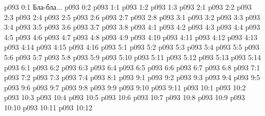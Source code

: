 \author{Мелхиседек}
\vs p093 0:1  Бла-бла...
\vs p093 0:2 \pc 
{}
\vs p093 1:1 
\vs p093 1:2 
\vs p093 1:3 
\vs p093 2:1 
\vs p093 2:2 
\vs p093 2:3 
\vs p093 2:4 \pc 
\vs p093 2:5 \pc 
\vs p093 2:6 
\vs p093 2:7 \pc 
\vs p093 2:8 
\vs p093 3:1 
\vs p093 3:2 
\vs p093 3:3 
\vs p093 3:4 
\vs p093 3:5 
\vs p093 3:6 
\vs p093 3:7 
\vs p093 3:8 
\vs p093 4:1 
\vs p093 4:2 
\vs p093 4:3 
\vs p093 4:4 
\vs p093 4:5 \pc 
\vs p093 4:6 \pc 
\vs p093 4:7 
\vs p093 4:8 
\vs p093 4:9 
\vs p093 4:10 
\vs p093 4:11 
\vs p093 4:12 
\vs p093 4:13 
\vs p093 4:14 \pc 
\vs p093 4:15 
\vs p093 4:16 \pc 
{}
\vs p093 5:1 
\vs p093 5:2 
\vs p093 5:3 
\vs p093 5:4 
\vs p093 5:5 
\vs p093 5:6 
\vs p093 5:7 \pc 
\vs p093 5:8 
\vs p093 5:9 \pc 
\vs p093 5:10 
\vs p093 5:11 
\vs p093 5:12 
\vs p093 5:13 
\vs p093 5:14 
\vs p093 6:1 
\vs p093 6:2 
\vs p093 6:3 
\vs p093 6:4 \pc 
\vs p093 6:5 
\vs p093 6:6 
\vs p093 6:7 
\vs p093 6:8 
\vs p093 7:1 
\vs p093 7:2 
\vs p093 7:3 
\vs p093 7:4 \pc 
{}
\vs p093 8:1 
\vs p093 9:1 
\vs p093 9:2 \pc 
\vs p093 9:3 
\vs p093 9:4 
\vs p093 9:5 \pc 
\vs p093 9:6 
\vs p093 9:7 
\vs p093 9:8 
\vs p093 9:9 \pc 
\vs p093 9:10 
\vs p093 9:11 
\vs p093 10:1 
\vs p093 10:2 
\vs p093 10:3 \pc 
\vs p093 10:4 
\vs p093 10:5 
\vs p093 10:6 
\vs p093 10:7 
\vs p093 10:8 
\vs p093 10:9 
\vs p093 10:10 
\vs p093 10:11 \pc 
\vsetoff
\vs p093 10:12 
\quizlink
